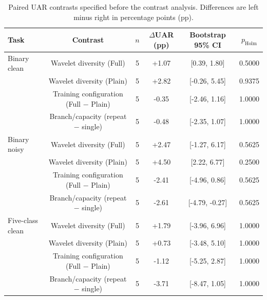 \begin{table}[H]
\centering\color{black}
\caption{Paired UAR contrasts specified before the contrast analysis. Differences are left minus right in percentage points (pp).}\label{tab:supp_controlled_statistics}
\begingroup
\fontsize{8.0}{9.2}\selectfont
\setlength{\tabcolsep}{3pt}\renewcommand{\arraystretch}{1.03}
\begin{tabular*}{\linewidth}{@{\extracolsep{\fill}}lccccc@{}}\toprule
\textbf{Task} & \textbf{Contrast} & \textbf{$n$} & \textbf{$\Delta$UAR (pp)} & \textbf{Bootstrap 95\% CI} & \textbf{$p_{\mathrm{Holm}}$}\\\midrule
Binary clean & Wavelet diversity (Full) & 5 & +1.07 & [0.39, 1.80] & 0.5000\\
 & Wavelet diversity (Plain) & 5 & +2.82 & [-0.26, 5.45] & 0.9375\\
 & Training configuration (Full $-$ Plain) & 5 & -0.35 & [-2.46, 1.16] & 1.0000\\
 & Branch/capacity (repeat $-$ single) & 5 & -0.48 & [-2.35, 1.07] & 1.0000\\
\midrule
Binary noisy & Wavelet diversity (Full) & 5 & +2.47 & [-1.27, 6.17] & 0.5625\\
 & Wavelet diversity (Plain) & 5 & +4.50 & [2.22, 6.77] & 0.2500\\
 & Training configuration (Full $-$ Plain) & 5 & -2.41 & [-4.96, 0.86] & 0.5625\\
 & Branch/capacity (repeat $-$ single) & 5 & -2.61 & [-4.79, -0.27] & 0.5625\\
\midrule
Five-class clean & Wavelet diversity (Full) & 5 & +1.79 & [-3.96, 6.96] & 1.0000\\
 & Wavelet diversity (Plain) & 5 & +0.73 & [-3.48, 5.10] & 1.0000\\
 & Training configuration (Full $-$ Plain) & 5 & -1.12 & [-5.25, 2.87] & 1.0000\\
 & Branch/capacity (repeat $-$ single) & 5 & -3.71 & [-8.47, 1.05] & 1.0000\\
\bottomrule\end{tabular*}
\endgroup
{}
\end{table}